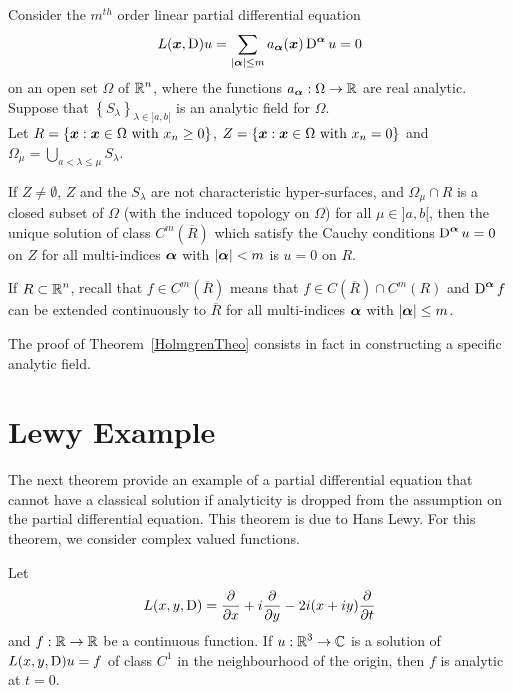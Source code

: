 \begin{theorem}[Holmgren]
Consider the $m^{th}$ order linear partial differential equation
\[
L({\bm{x}}, \operatorname{D})u = \sum_{|{\bm{\alpha}}|\leq m}
a_{{\bm{\alpha}}}({\bm{x}}) \operatorname{D}^{{\bm{\alpha}}} u = 0
\]
on an open set $\Omega$ of $\displaystyle \mathbb{R}^n$, where the functions
$a_{{\bm{\alpha}}}:\Omega\rightarrow \mathbb{R}$ are real analytic. Suppose that
$\displaystyle \left\{ S_\lambda \right\}_{\lambda \in ]a,b[}$ is an
analytic field for $\Omega$.\\
Let
$\displaystyle
R = \left\{ {\bm{x}} : {\bm{x}} \in \Omega \ \text{with} \ x_n\geq 0 \right\}$,
$\displaystyle
Z = \left\{ {\bm{x}} : {\bm{x}} \in \Omega \ \text{with} \ x_n = 0 \right\}$
and
$\displaystyle \Omega_\mu = \bigcup_{a<\lambda \leq \mu} S_\lambda$.

If $Z \neq \emptyset$, $Z$ and the $S_\lambda$ are not characteristic
hyper-surfaces, and
$\Omega_\mu \cap R$ is a closed subset of $\Omega$ (with
the induced topology on $\Omega$) for all $\mu \in ]a,b[$, then the
unique solution of class $\displaystyle C^m(\overline{R})$ which
satisfy the Cauchy conditions $\displaystyle \operatorname{D}^{{\bm{\alpha}}} u = 0$ on
$Z$ for all multi-indices ${\bm{\alpha}}$ with $|{\bm{\alpha}}|<m$
is $u=0$ on $R$.
\end{theorem}

If $\displaystyle R\subset \mathbb{R}^n$, recall that
$\displaystyle f \in C^m(\overline{R})$ means that
$\displaystyle f\in C(\overline{R}) \cap C^m(R)$ and
$\displaystyle \operatorname{D}^{{\bm{\alpha}}} f$ can be extended
continuously to $\overline{R}$ for all multi-indices ${\bm{\alpha}}$ with
$|{\bm{\alpha}}|\leq m$.

The proof of Theorem~\ref{HolmgrenTheo} consists in fact in
constructing a specific analytic field.

\section{Lewy Example}

The next theorem provide an example of a partial differential equation
that cannot have a classical solution  if analyticity is dropped from
the assumption on the partial differential equation.  This theorem is
due to Hans Lewy.  For this theorem, we consider complex valued
functions.

\begin{theorem}[Lewy] \label{Lewy}
Let
\[
L(x,y,\operatorname{D}) = \frac{\partial{}}{\partial x} + i \frac{\partial{}}{\partial y} - 2i(x+iy)\frac{\partial{}}{\partial t}
\]
and $f:\mathbb{R}\to \mathbb{R}$ be a continuous function.  If
$\displaystyle u:\mathbb{R}^3\to \mathbb{C}$ is a
solution of $L(x,y,\operatorname{D})u = f$ of class $\displaystyle C^1$ in the
neighbourhood of the origin, then $f$ is analytic at $t=0$.
\end{theorem}


